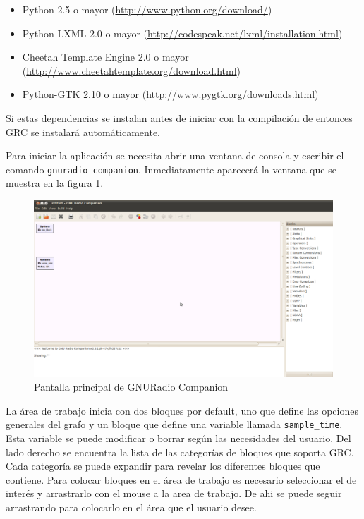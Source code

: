 \begin{itemize}
  \item Python 2.5 o mayor (\url{http://www.python.org/download/})
  \item Python-LXML 2.0 o  mayor (\url{http://codespeak.net/lxml/installation.html})
  \item Cheetah Template Engine 2.0 o mayor (\url{http://www.cheetahtemplate.org/download.html})
  \item Python-GTK 2.10 o mayor (\url{http://www.pygtk.org/downloads.html})
\end{itemize}

Si estas dependencias se instalan antes de iniciar con la compilaci\'on de \gnuradio entonces GRC se
instalar\'a autom\'aticamente.

Para iniciar la aplicaci\'on se necesita abrir una ventana de consola y escribir el comando
\verb|gnuradio-companion|. Inmediatamente aparecer\'a la ventana que se muestra en la figura
\ref{fig:grc}.

\begin{figure}[tp]
  \centering
  \includegraphics[width=5.5in]{figs/grc1}
  \vspace{0.1in}
  \caption{Pantalla principal de GNURadio Companion}
  \label{fig:grc}
\end{figure}

La \'area de trabajo inicia con dos bloques por default, uno que define las opciones generales del
grafo y un bloque que define una variable llamada \verb|sample_time|. Esta variable se puede
modificar o borrar seg\'un las necesidades del usuario. Del lado derecho se encuentra la lista de las
categor\'ias de bloques que soporta GRC. Cada categor\'ia se puede expandir para revelar los
diferentes bloques que contiene. Para colocar bloques en el \'area de trabajo es necesario
seleccionar el de inter\'es y arrastrarlo con el mouse a la area de trabajo. De ahi se puede seguir
arrastrando para colocarlo en el \'area que el usuario desee. 

